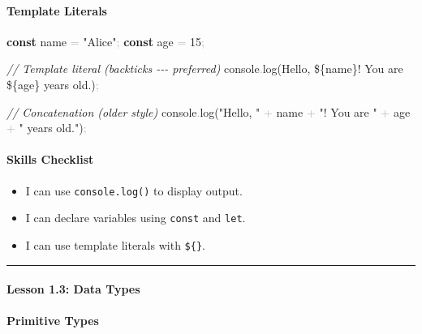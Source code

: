 \documentclass[
  justified,
  openright,
]{tufte-book}
\let\subsection\paragraph
\let\paragraph\paragraph
\newcommand{\KeywordTok}[1]{\textcolor{CodeKeyword}{\textbf{#1}}}  %
\newcommand{\StringTok}[1]{\textcolor{CodeString}{#1}}              %
\newcommand{\CommentTok}[1]{\textcolor{CodeComment}{\textit{#1}}}  %
\newcommand{\CodeNumTok}[1]{\textcolor{CodeNumber}{#1}}             %
\newcommand{\CodeFuncTok}[1]{\textcolor{CodeKeyword}{#1}}           %
\newcommand{\OperatorTok}[1]{\textcolor{DarkGray}{#1}}              %
\newenvironment{Shaded}{%
  \begin{mdframed}[style=TufteCode]%
}{%
  \end{mdframed}%
}
\let\subsection\paragraph
\let\paragraph\paragraph
\providecommand{\tightlist}{%
  \setlength{\itemsep}{0pt}\setlength{\parskip}{0pt}}
\begin{document}
\subsection{Template Literals}\label{template-literals}

\begin{Shaded}
\begin{Highlighting}[]
\KeywordTok{const} name \OperatorTok{=} \StringTok{"Alice"}\OperatorTok{;}
\KeywordTok{const} age \OperatorTok{=} \CodeNumTok{15}\OperatorTok{;}
 
\CommentTok{// Template literal (backticks {-}{-}{-} preferred)}
console\OperatorTok{.}\CodeFuncTok{log}(\StringTok{\textasciigrave{}Hello, }\StringTok{\$\{}name\StringTok{\}}\StringTok{! You are }\StringTok{\$\{}age\StringTok{\}}\StringTok{ years old.\textasciigrave{}})\OperatorTok{;}
 
\CommentTok{// Concatenation (older style)}
console\OperatorTok{.}\CodeFuncTok{log}(\StringTok{"Hello, "} \OperatorTok{+} name \OperatorTok{+} \StringTok{"! You are "} \OperatorTok{+} age \OperatorTok{+} \StringTok{" years old."})\OperatorTok{;}
\end{Highlighting}
\end{Shaded}

\subsection{Skills Checklist}\label{skills-checklist-54}

\begin{itemize}
\tightlist
\item[$\square$]
  I can use \texttt{console.log()} to display output.
\item[$\square$]
  I can declare variables using \texttt{const} and \texttt{let}.
\item[$\square$]
  I can use template literals with \texttt{\$\{\}}.
\end{itemize}

\begin{center}\rule{0.5\linewidth}{0.5pt}\end{center}

\subsection{Lesson 1.3: Data Types}\label{lesson-1.3-data-types}

\subsection{Primitive Types}\label{primitive-types}
\end{document}
